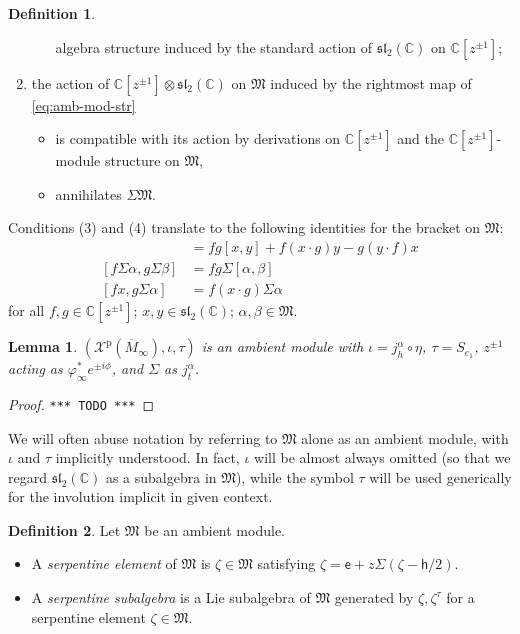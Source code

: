 \documentclass{article}
\def\MISS{\texttt{*** TODO ***}}
\def\fsl{\mathfrak{sl}}
\def\fM{\mathfrak{M}}
\def\CC{\mathbb{C}}
\def\XX{\mathcal{X}}
\def\inv{\tau} %
\def\e{\mathsf{e}}
\def\h{\mathsf{h}}
\def\p{\mathrm{p}}
\newtheorem{lem}{Lemma}
\theoremstyle{definition}
\newtheorem{defn}{Definition}
\begin{document}
\begin{defn}
\begin{enumerate}
\begin{itemize}
        algebra structure induced by the standard action of $\fsl_2(\CC)$ on $\CC[z^{\pm1}]$;
\end{itemize}
\item the action of $\CC[z^{\pm 1}]\otimes\fsl_2(\CC)$ on $\fM$ induced by
        the rightmost map of \eqref{eq:amb-mod-str}
        \begin{itemize}
                \item is compatible with its action by derivations on $\CC[z^{\pm1}]$ and
                        the $\CC[z^{\pm1}]$-module structure on $\fM$,
                \item annihilates $\Sigma\fM$.
        \end{itemize}
\end{enumerate}
Conditions (3) and (4) translate to the
following identities for the bracket on $\fM$:
\begin{align*}
        [f x, g y] &= fg[x,y] + f(x\cdot g)y-g(y\cdot f)x  \\
        [f \Sigma\alpha, g\Sigma\beta ] &= fg \Sigma[\alpha,\beta]\\
        [f x, g \Sigma \alpha] &=f (x\cdot g)\Sigma\alpha  
\end{align*}
for all $f,g \in \CC[z^{\pm1}]$; $x,y \in \fsl_2(\CC)$; $\alpha,\beta \in \fM$.
\end{defn}

\begin{lem} \label{lem:smod} $(\XX^\p(\overline M_\infty),\iota,\inv)$ is an ambient module
        with $\iota=j^\alpha_h\circ \eta$, $\inv=S_{e_1}$, $z^{\pm1}$ acting as $\varphi_\infty^* e^{\pm i\phi}$, and
        $\Sigma$ as $j^\alpha_t$.
\end{lem}
\begin{proof}\MISS\end{proof}

We will often abuse notation by referring to $\fM$ alone
as an ambient module, with $\iota$ and $\inv$ implicitly
understood. In fact, $\iota$ will be almost always omitted
(so that we regard $\fsl_2(\CC)$ as a subalgebra in $\fM$),
while the symbol $\inv$ will be used generically for the
involution implicit in given context.


\begin{defn}Let $\fM$ be an ambient module.
        \begin{itemize}
\item A \emph{serpentine element} of $\fM$
                        is
        $\zeta \in \fM$ satisfying $\zeta = \e + z\Sigma(\zeta - \h/2)$.
\item A \emph{serpentine subalgebra} is a Lie subalgebra of $\fM$
        generated by $\zeta,\zeta^\inv$ for a serpentine element $\zeta \in\fM$.
\end{itemize}
\end{defn}
\end{document}

